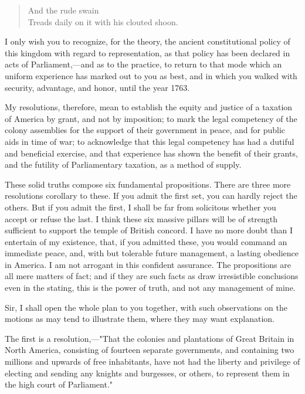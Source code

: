 \begin{verse}
And the rude swain \\
Treads daily on it with his clouted shoon.
\end{verse}

I only wish you to recognize, for the theory, the ancient constitutional policy of this kingdom with regard to representation, as that policy has been declared in acts of Parliament,—and as to the practice, to return to that mode which an uniform experience has marked out to you as best, and in which you walked with security, advantage, and honor, until the year 1763.

My resolutions, therefore, mean to establish the equity and justice of a taxation of America by grant, and not by imposition; to mark the legal competency of the colony assemblies for the support of their government in peace, and for public aids in time of war; to acknowledge that this legal competency has had a dutiful and beneficial exercise, and that experience has shown the benefit of their grants, and the futility of Parliamentary taxation, as a method of supply.

These solid truths compose six fundamental propositions. There are three more resolutions corollary to these. If you admit the first set, you can hardly reject the others. But if you admit the first, I shall be far from solicitous whether you accept or refuse the last. I think these six massive pillars will be of strength sufficient to support the temple of British concord. I have no more doubt than I entertain of my existence, that, if you admitted these, you would command an immediate peace, and, with but tolerable future management, a lasting obedience in America. I am not arrogant in this confident assurance. The propositions are all mere matters of fact; and if they are such facts as draw irresistible conclusions even in the stating, this is the power of truth, and not any management of mine.

Sir, I shall open the whole plan to you together, with such observations on the motions as may tend to illustrate them, where they may want explanation.

The first is a resolution,—"That the colonies and plantations of Great Britain in North America, consisting of fourteen separate governments, and containing two millions and upwards of free inhabitants, have not had the liberty and privilege of electing and sending any knights and burgesses, or others, to represent them in the high court of Parliament."

